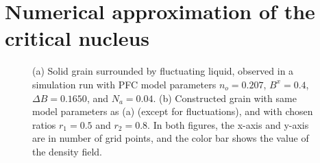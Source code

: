 \section{Numerical approximation of the critical nucleus}\label{sec:num_testnuc}


\begin{figure}[!h]
    \centering
{}
\caption{(a) Solid grain surrounded by fluctuating liquid, observed in a simulation run with PFC model parameters $n_o=0.207$, $B^x=0.4$, $\Delta B=0.1650$, and $N_a=0.04$. (b) Constructed grain with same model parameters as (a) (except for fluctuations), and with chosen ratios $r_1=0.5$ and $r_2=0.8$. In both figures, the x-axis and y-axis are in number of grid points, and the color bar shows the value of the density field.}\label{fig:num_compareTestWavelet}
\end{figure}


